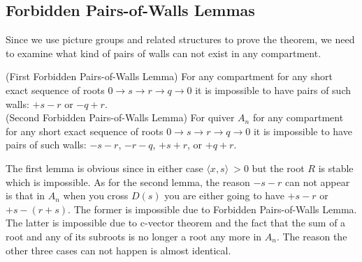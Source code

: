 \subsection{Forbidden Pairs-of-Walls Lemmas}
\indent Since we use picture groups and related structures to prove the theorem, we need to examine what kind of pairs of walls can not exist in any compartment.\\
\begin{lemma}
(First Forbidden Pairs-of-Walls Lemma) For any compartment for any short exact sequence of roots $0\rightarrow s\rightarrow r\rightarrow q\rightarrow 0$ it is impossible to have pairs of such walls: $+s-r$ or $-q+r$.\\
(Second Forbidden Pairs-of-Walls Lemma) For quiver $A_n$ for any compartment for any short exact sequence of roots $0\rightarrow s\rightarrow r\rightarrow q\rightarrow 0$ it is impossible to have pairs of such walls: $-s-r$, $-r-q$, $+s+r$, or $+q+r$.\\
\end{lemma}
\indent The first lemma is obvious since in either case $\langle x,s\rangle\ >0$ but the root $R$ is stable which is impossible. As for the second lemma, the reason $-s-r$ can not appear is that in $A_n$ when you cross $D(s)$ you are either going to have $+s-r$ or $+s-(r+s)$. The former is impossible due to Forbidden Pairs-of-Walls Lemma. The latter is impossible due to c-vector theorem and the fact that the sum of a root and any of its subroots is no longer a root any more in $A_n$. The reason the other three cases can not happen is almost identical.\\
